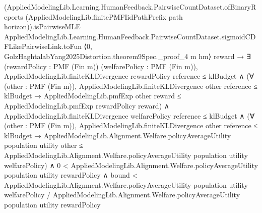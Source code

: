 \documentclass[10pt]{article}
\begin{document}
\begin{ReviewVerbatim}
                            (AppliedModelingLib.Learning.HumanFeedback.PairwiseCountDataset.ofBinaryReports
                                    (AppliedModelingLib.finitePMFIidPathPrefix path horizon)).isPairwiseMLE
                                AppliedModelingLib.Learning.HumanFeedback.PairwiseCountDataset.sigmoidCDFLikePairwiseLink.toFun
                                ⟨0, GolzHaghtalabYang2025Distortion.theorem9Spec._proof_4 m hm⟩ reward →
                              ∃ (rewardPolicy : PMF (Fin m)) (welfarePolicy : PMF (Fin m)),
                                AppliedModelingLib.finiteKLDivergence rewardPolicy reference ≤ klBudget ∧
                                  (∀ (other : PMF (Fin m)),
                                      AppliedModelingLib.finiteKLDivergence other reference ≤ klBudget →
                                        AppliedModelingLib.pmfExp other reward ≤
                                          AppliedModelingLib.pmfExp rewardPolicy reward) ∧
                                    AppliedModelingLib.finiteKLDivergence welfarePolicy reference ≤ klBudget ∧
                                      (∀ (other : PMF (Fin m)),
                                          AppliedModelingLib.finiteKLDivergence other reference ≤ klBudget →
                                            AppliedModelingLib.Alignment.Welfare.policyAverageUtility population utility
                                                other ≤
                                              AppliedModelingLib.Alignment.Welfare.policyAverageUtility population
                                                utility welfarePolicy) ∧
                                        0 <
                                            AppliedModelingLib.Alignment.Welfare.policyAverageUtility population utility
                                              rewardPolicy ∧
                                          bound <
                                            AppliedModelingLib.Alignment.Welfare.policyAverageUtility population utility
                                                welfarePolicy /
                                              AppliedModelingLib.Alignment.Welfare.policyAverageUtility population
                                                utility rewardPolicy
\end{ReviewVerbatim}
\end{document}
